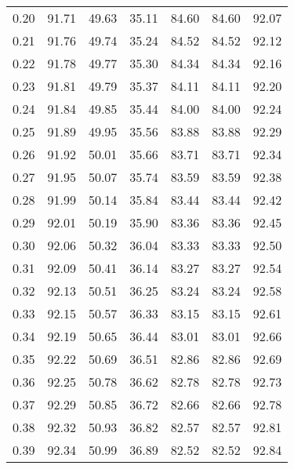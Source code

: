 \begin{tabular}{|c|c|c|c|c|c|c|}
      0.20 &     91.71 &     49.63 &      35.11 &   84.60 &      84.60 &         92.07 \\
      0.21 &     91.76 &     49.74 &      35.24 &   84.52 &      84.52 &         92.12 \\
      0.22 &     91.78 &     49.77 &      35.30 &   84.34 &      84.34 &         92.16 \\
      0.23 &     91.81 &     49.79 &      35.37 &   84.11 &      84.11 &         92.20 \\
      0.24 &     91.84 &     49.85 &      35.44 &   84.00 &      84.00 &         92.24 \\
      0.25 &     91.89 &     49.95 &      35.56 &   83.88 &      83.88 &         92.29 \\
      0.26 &     91.92 &     50.01 &      35.66 &   83.71 &      83.71 &         92.34 \\
      0.27 &     91.95 &     50.07 &      35.74 &   83.59 &      83.59 &         92.38 \\
      0.28 &     91.99 &     50.14 &      35.84 &   83.44 &      83.44 &         92.42 \\
      0.29 &     92.01 &     50.19 &      35.90 &   83.36 &      83.36 &         92.45 \\
      0.30 &     92.06 &     50.32 &      36.04 &   83.33 &      83.33 &         92.50 \\
      0.31 &     92.09 &     50.41 &      36.14 &   83.27 &      83.27 &         92.54 \\
      0.32 &     92.13 &     50.51 &      36.25 &   83.24 &      83.24 &         92.58 \\
      0.33 &     92.15 &     50.57 &      36.33 &   83.15 &      83.15 &         92.61 \\
      0.34 &     92.19 &     50.65 &      36.44 &   83.01 &      83.01 &         92.66 \\
      0.35 &     92.22 &     50.69 &      36.51 &   82.86 &      82.86 &         92.69 \\
      0.36 &     92.25 &     50.78 &      36.62 &   82.78 &      82.78 &         92.73 \\
      0.37 &     92.29 &     50.85 &      36.72 &   82.66 &      82.66 &         92.78 \\
      0.38 &     92.32 &     50.93 &      36.82 &   82.57 &      82.57 &         92.81 \\
      0.39 &     92.34 &     50.99 &      36.89 &   82.52 &      82.52 &         92.84 \\

\end{tabular}

